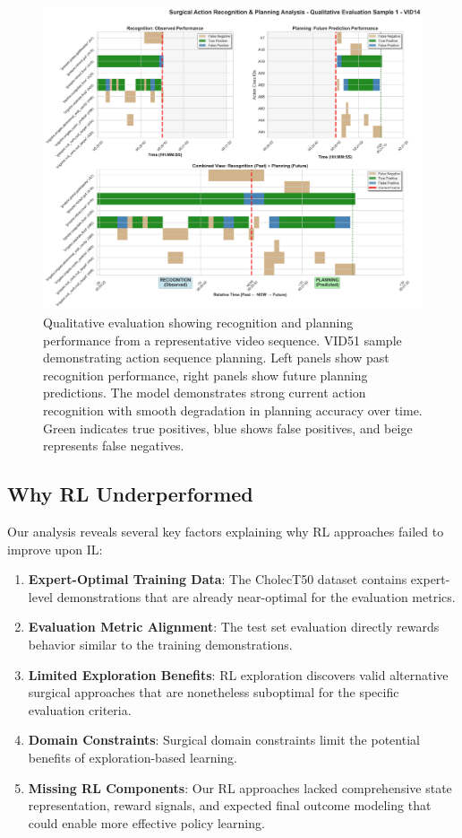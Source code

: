 \documentclass[runningheads]{llncs}
\begin{document}
\begin{figure}[h]
\centering
\includegraphics[width=\textwidth]{VID14_preds_sample_1.png}
\caption{Qualitative evaluation showing recognition and planning performance from a representative video sequence. VID51 sample demonstrating action sequence planning. Left panels show past recognition performance, right panels show future planning predictions. The model demonstrates strong current action recognition with smooth degradation in planning accuracy over time. Green indicates true positives, blue shows false positives, and beige represents false negatives.}
\label{fig:qualitative_examples}
\end{figure}

\subsection{Why RL Underperformed}

Our analysis reveals several key factors explaining why RL approaches failed to improve upon IL:

\begin{enumerate}
\item \textbf{Expert-Optimal Training Data}: The CholecT50 dataset contains expert-level demonstrations that are already near-optimal for the evaluation metrics.
\item \textbf{Evaluation Metric Alignment}: The test set evaluation directly rewards behavior similar to the training demonstrations.
\item \textbf{Limited Exploration Benefits}: RL exploration discovers valid alternative surgical approaches that are nonetheless suboptimal for the specific evaluation criteria.
\item \textbf{Domain Constraints}: Surgical domain constraints limit the potential benefits of exploration-based learning.
\item \textbf{Missing RL Components}: Our RL approaches lacked comprehensive state representation, reward signals, and expected final outcome modeling that could enable more effective policy learning.
\end{enumerate}
\end{document}
